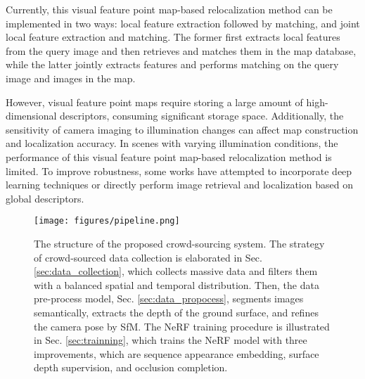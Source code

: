 \documentclass[conference]{./support/ieeeconf}
\begin{document}
Currently, this visual feature point map-based relocalization method can be implemented in two ways: local feature extraction followed by matching, and joint local feature extraction and matching. The former first extracts local features from the query image and then retrieves and matches them in the map database, while the latter jointly extracts features and performs matching on the query image and images in the map.

However, visual feature point maps require storing a large amount of high-dimensional descriptors, consuming significant storage space. Additionally, the sensitivity of camera imaging to illumination changes can affect map construction and localization accuracy. In scenes with varying illumination conditions, the performance of this visual feature point map-based relocalization method is limited. To improve robustness, some works have attempted to incorporate deep learning techniques or directly perform image retrieval and localization based on global descriptors.
\cite{arandjelovic2016netvlad,hausler2021patch,sarlin2018leveraging}


\begin{figure*}[t]
	\centering
	\texttt{[image: figures/pipeline.png]}
	\caption{
		The structure of the proposed crowd-sourcing system. The strategy of crowd-sourced data collection is elaborated in Sec. \ref{sec:data_collection}, which collects massive data and filters them with a balanced spatial and temporal distribution.
			Then, the data pre-process model, Sec. \ref{sec:data_propocess}, segments images semantically, extracts the depth of the ground surface, and refines the camera pose by SfM. 
			The NeRF training procedure is illustrated in Sec. \ref{sec:trainning}, which trains the NeRF model with three improvements, which are sequence appearance embedding, surface depth supervision, and occlusion completion.
		}
	\label{fig:framework}
\end{figure*}
\end{document}
